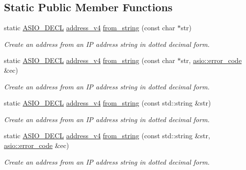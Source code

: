\subsection*{Static Public Member Functions}
\begin{DoxyCompactItemize}
\item 
static \hyperlink{config_8hpp_ab54d01ea04afeb9a8b39cfac467656b7}{A\+S\+I\+O\+\_\+\+D\+E\+C\+L} \hyperlink{classasio_1_1ip_1_1address__v4}{address\+\_\+v4} \hyperlink{classasio_1_1ip_1_1address__v4_a2fc87f6795a0b86a9ba66e1ce53b66d5}{from\+\_\+string} (const char $\ast$str)
\begin{DoxyCompactList}\small\item\em Create an address from an I\+P address string in dotted decimal form. \end{DoxyCompactList}\item 
static \hyperlink{config_8hpp_ab54d01ea04afeb9a8b39cfac467656b7}{A\+S\+I\+O\+\_\+\+D\+E\+C\+L} \hyperlink{classasio_1_1ip_1_1address__v4}{address\+\_\+v4} \hyperlink{classasio_1_1ip_1_1address__v4_adc5bc3d0dbf26175ce16120b1c13c0a1}{from\+\_\+string} (const char $\ast$str, \hyperlink{classasio_1_1error__code}{asio\+::error\+\_\+code} \&ec)
\begin{DoxyCompactList}\small\item\em Create an address from an I\+P address string in dotted decimal form. \end{DoxyCompactList}\item 
static \hyperlink{config_8hpp_ab54d01ea04afeb9a8b39cfac467656b7}{A\+S\+I\+O\+\_\+\+D\+E\+C\+L} \hyperlink{classasio_1_1ip_1_1address__v4}{address\+\_\+v4} \hyperlink{classasio_1_1ip_1_1address__v4_adce52f7eb06455c4a12261a42c60dcc1}{from\+\_\+string} (const std\+::string \&str)
\begin{DoxyCompactList}\small\item\em Create an address from an I\+P address string in dotted decimal form. \end{DoxyCompactList}\item 
static \hyperlink{config_8hpp_ab54d01ea04afeb9a8b39cfac467656b7}{A\+S\+I\+O\+\_\+\+D\+E\+C\+L} \hyperlink{classasio_1_1ip_1_1address__v4}{address\+\_\+v4} \hyperlink{classasio_1_1ip_1_1address__v4_afc47aec2bcf562c666853c94cf79399f}{from\+\_\+string} (const std\+::string \&str, \hyperlink{classasio_1_1error__code}{asio\+::error\+\_\+code} \&ec)
\begin{DoxyCompactList}\small\item\em Create an address from an I\+P address string in dotted decimal form. \end{DoxyCompactList}\item 

\end{DoxyCompactItemize}
